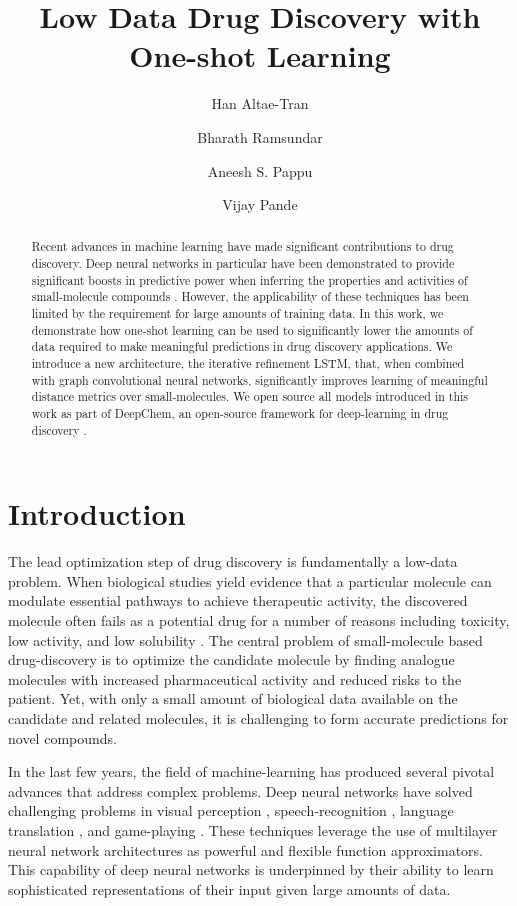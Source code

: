 \documentclass[journal=jacsat,manuscript=article]{achemso}
\author{Han Altae-Tran}
\affiliation{Department of Biological Engineering, Massachusetts Institute of Technology}
\author{Bharath Ramsundar}
\affiliation{Department of Computer Science, Stanford University}
\author{Aneesh S. Pappu}
\affiliation{Department of Computer Science, Stanford University}
\author{Vijay Pande}
\affiliation{Department of Chemistry, Stanford University}
\title{Low Data Drug Discovery with One-shot Learning}
\begin{document}
\maketitle

\begin{abstract}
Recent advances in machine learning have made significant contributions to drug discovery. Deep neural networks in particular have been demonstrated to provide significant boosts in predictive power when inferring the properties and activities of small-molecule compounds \cite{ma2015deep}. However, the applicability of these techniques has been limited by the requirement for large amounts of training data. In this work, we demonstrate how one-shot learning can be used to significantly lower the amounts of data required to make meaningful predictions in drug discovery applications. We introduce a new architecture, the iterative refinement LSTM, that, when combined with graph convolutional neural networks, significantly improves learning of meaningful distance metrics over small-molecules. We open source all models introduced in this work as part of DeepChem, an open-source framework for deep-learning in drug discovery
\cite{ram2016}.
\end{abstract}

\section{Introduction}
The lead optimization step of drug discovery is fundamentally a low-data problem. When biological studies yield evidence that a particular molecule can modulate essential pathways to achieve therapeutic activity, the discovered molecule often fails as a potential drug for a number of reasons including toxicity, low activity, and low solubility \cite{waring2015analysis}. The central problem of small-molecule based drug-discovery is to optimize the candidate molecule by finding analogue molecules with increased pharmaceutical activity and reduced risks to the patient. Yet, with only a small amount of biological data available on the candidate and related molecules, it is challenging to form accurate predictions for novel compounds.

In the last few years, the field of machine-learning has produced several pivotal advances that address complex problems. Deep neural networks have solved challenging problems in visual perception \cite{ILSVRC15}, speech-recognition \cite{deng2013new}, language translation \cite{wu2016google}, and game-playing \cite{silver2016mastering}. These techniques leverage the use of multilayer neural network architectures as powerful and flexible function approximators. This capability of deep neural networks is underpinned by their ability to learn sophisticated representations of their input given large amounts of data.
\end{document}
